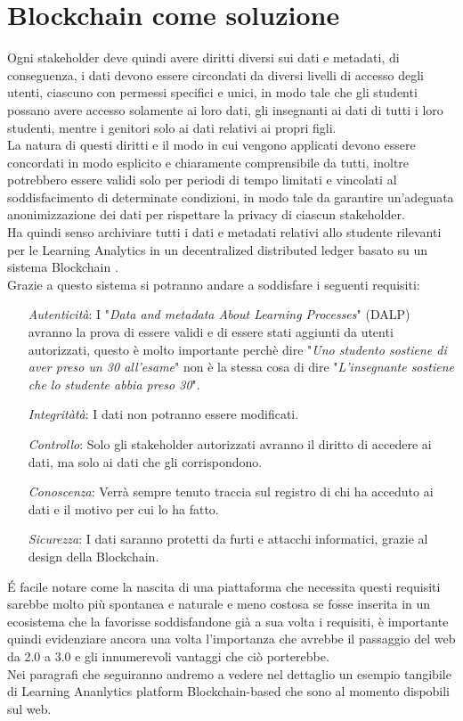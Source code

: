 \section{Blockchain come soluzione}
Ogni stakeholder deve quindi avere diritti diversi sui dati e metadati, 
di conseguenza, i dati devono essere circondati da diversi livelli di accesso degli utenti, ciascuno con permessi specifici e unici,
in modo tale che gli studenti possano avere accesso solamente ai loro dati, gli insegnanti ai dati di tutti i loro studenti, mentre i genitori solo ai dati relativi ai propri figli.
\\La natura di questi diritti e il modo in cui vengono applicati devono essere concordati in modo esplicito e chiaramente comprensibile da tutti, 
inoltre potrebbero essere validi solo per periodi di tempo limitati e vincolati al soddisfacimento di determinate condizioni, in modo tale da garantire un'adeguata anonimizzazione dei dati per rispettare la privacy di ciascun stakeholder.
\\Ha quindi senso archiviare tutti i dati e metadati relativi allo studente rilevanti per le Learning Analytics in un decentralized distributed ledger basato su un sistema Blockchain \cite{Learning_Analytics_Privacy_on_the_Blockchain}.
\\Grazie a questo sistema si potranno andare a soddisfare i seguenti requisiti:
\begin{itemize}
    \item[\textit{Autenticità}:] I "\textit{Data and metadata About Learning Processes}" (DALP) avranno la prova di essere validi e di essere stati aggiunti da utenti autorizzati, questo è molto importante perchè dire "\textit{Uno studento sostiene di aver preso un 30 all'esame}" non è la stessa cosa di dire "\textit{L'insegnante sostiene che lo studente abbia preso 30}".
    \item[\textit{Integritàtà}:] I dati non potranno essere modificati.
    \item[\textit{Controllo}:] Solo gli stakeholder autorizzati avranno il diritto di accedere ai dati, ma solo ai dati che gli corrispondono. 
    \item[\textit{Conoscenza}:] Verrà sempre tenuto traccia sul registro di chi ha acceduto ai dati e il motivo per cui lo ha fatto.
    \item[\textit{Sicurezza}:] I dati saranno protetti da furti e attacchi informatici, grazie al design della Blockchain.
\end{itemize}
\'E facile notare come la nascita di una piattaforma che necessita questi requisiti sarebbe molto più spontanea e naturale e meno costosa se 
fosse inserita in un ecosistema che la favorisse soddisfandone già a sua volta i requisiti, è importante quindi evidenziare ancora una volta
l'importanza che avrebbe il passaggio del web da 2.0 a 3.0 e gli innumerevoli vantaggi che ciò porterebbe.
\\Nei paragrafi che seguiranno andremo a vedere nel dettaglio un esempio tangibile di Learning Ananlytics platform Blockchain-based che sono al momento dispobili sul web.
\newpage
